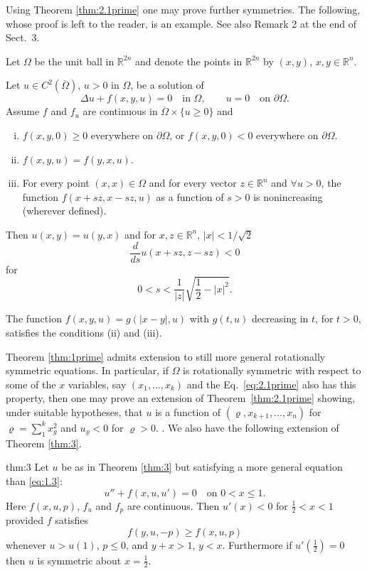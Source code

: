 Using Theorem \ref{thm:2.1prime} one may prove further symmetries.
The following, whose proof is left to the reader, is an example.
See also Remark 2 at the end of Sect.~3.

Let $\Omega$ be the unit ball in $\mathbb{R}^{2n}$ and denote the points in $\mathbb{R}^{2n}$
by $(x,y)$, $x,y\in \mathbb{R}^n$.

\begin{corollary}\label{cor:2}
  Let $u\in C^2(\overline{\Omega})$, $u>0$ in $\Omega$, be a solution of
  \[\Delta u + f(x,y,u) = 0\quad\text{in } \Omega,\qquad u = 0\quad\text{on } \partial\Omega.\]
  Assume $f$ and $f_u$ are continuous in $\overline{\Omega}\times\{u\geq 0\}$ and
  \begin{enumerate}[(i)]
    \item $f(x,y,0) \geq 0$ everywhere on $\partial\Omega$,
      or $f(x,y,0)<0$ everywhere on $\partial\Omega$.
    \item $f(x,y,u) = f(y,x,u)$.
    \item For every point $(x,x)\in\Omega$ and for every vector $z\in \mathbb{R}^n$
      and $\forall u>0$, the function $f(x+sz, x-sz, u)$ as a function of $s>0$
      is nonincreasing (wherever defined).
  \end{enumerate}
  Then $u(x,y) = u(y,x)$ and for $x, z\in \mathbb{R}^n$, $|x|<1/\sqrt{2}$
  \[\frac{d}{ds} u(x+sz, z-sz) < 0\]
  for
  \[0 < s < \frac{1}{|z|}\sqrt{\frac12 - |x|^2}.\]
\end{corollary}

The function $f(x, y, u) = g(|x-y|, u)$ with $g(t, u)$ decreasing in $t$,
for $t>0$, satisfies the conditions (ii) and (iii).

Theorem \ref{thm:1prime} admits extension to still more general rotationally symmetric equations. 
In particular, if $\Omega$ is rotationally symmetric with respect to some of the $x$ variables, 
say $(x_1,\ldots,x_k)$ and the Eq.~\eqref{eq:2.1prime} also has this property,
then one may prove an extension of Theorem~\ref{thm:2.1prime} showing,
under suitable hypotheses, that $u$ is a function of $(\varrho, x_{k+1}, \ldots, x_n)$
for $\varrho = \sum_1^k x_g^2$ and $u_{\varrho}<0$ for $\varrho>0$.
\vspace*{5pt}
. We also have the following extension of Theorem \ref{thm:3}.

\begin{theoremp}{thm:3}\label{thm:3prime}
  Let $u$ be as in Theorem \ref{thm:3} but satisfying a more general equation
  than \eqref{eq:1.3}:
  \[u'' + f(x,u,u') = 0\quad\text{on } 0<x\leq 1.\]
  Here $f(x,u,p)$, $f_u$ and $f_p$ are continuous.
  Then $u'(x)<0$ for $\frac12 < x < 1$ provided $f$ satisfies
  \begin{equation}\label{eq:2.6prime}
    f(y,u,-p) \geq f(x,u,p) \tag{$2.6'$}
  \end{equation}
  whenever $u>u(1)$, $p\leq 0$, and $y+x>1$, $y<x$.
  Furthermore if $u'(\frac12) = 0$ then $u$ is symmetric about $x = \frac12$.
\end{theoremp}

